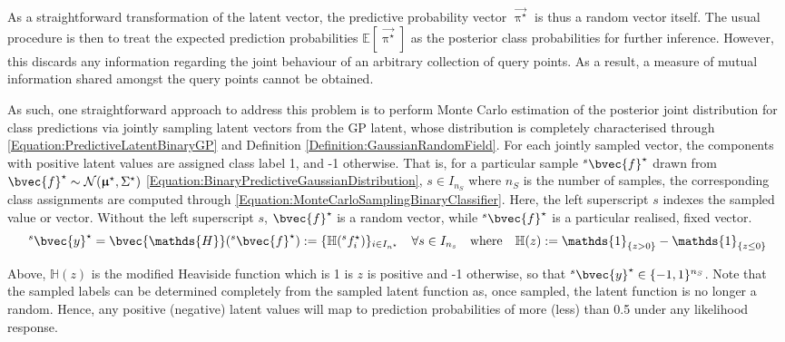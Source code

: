 			As a straightforward transformation of the latent vector, the predictive probability vector $\vec{\uppi^{\star}}$ is thus a random vector itself. The usual procedure is then to treat the expected prediction probabilities $\mathbb{E}[\vec{\uppi^{\star}}]$ as the posterior class probabilities for further inference. However, this discards any information regarding the joint behaviour of an arbitrary collection of query points. As a result, a measure of mutual information shared amongst the query points cannot be obtained.
			
			As such, one straightforward approach to address this problem is to perform Monte Carlo estimation of the posterior joint distribution for class predictions via jointly sampling latent vectors from the GP latent, whose distribution is completely characterised through \eqref{Equation:PredictiveLatentBinaryGP} and Definition \ref{Definition:GaussianRandomField}. For each jointly sampled vector, the components with positive latent values are assigned class label 1, and -1 otherwise. That is, for a particular sample ${^{s}}\bvec{f}^{\star}$ drawn from $\bvec{f}^{\star} \sim \mathcal{N}(\vec{\upmu}^{\star}, \Sigma^{\star})$ \eqref{Equation:BinaryPredictiveGaussianDistribution}, $s \in I_{n_{S}}$ where $n_{S}$ is the number of samples, the corresponding class assignments are computed through \eqref{Equation:MonteCarloSamplingBinaryClassifier}. Here, the left superscript $s$ indexes the sampled value or vector. Without the left superscript $s$, $\bvec{f}^{\star}$ is a random vector, while ${^{s}}\bvec{f}^{\star}$ is a particular realised, fixed vector. \begin{equation}
				{^{s}}\bvec{y}^{\star} = \bvec{\mathds{H}}({^{s}}\bvec{f}^{\star}) := \{\mathbb{H}({^{s}}f^{\star}_{i})\}_{i \in I_{n^{\star}}} \quad \forall s \in I_{n_{s}} \quad \mathrm{where} \quad \mathbb{H}(z) := \mathds{1}_{\{z > 0\}} - \mathds{1}_{\{z \leq 0\}}
			\label{Equation:MonteCarloSamplingBinaryClassifier}
			\end{equation}
			
			Above, $\mathbb{H}(z)$ is the modified Heaviside function which is 1 is $z$ is positive and -1 otherwise, so that ${^{s}}\bvec{y}^{\star} \in \{-1, 1\}^{n_{S}}$. Note that the sampled labels can be determined completely from the sampled latent function as, once sampled, the latent function is no longer a random. Hence, any positive (negative) latent values will map to prediction probabilities of more (less) than 0.5 under any likelihood response.
			
